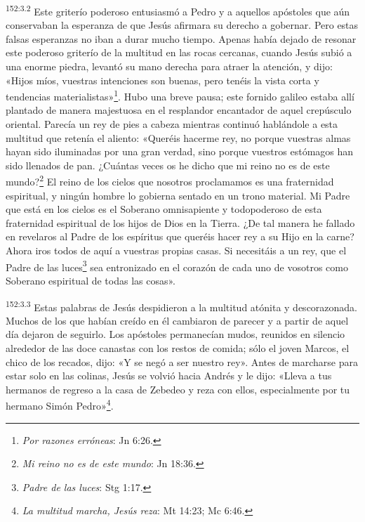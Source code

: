 \par
\textsuperscript{152:3.2} Este griterío poderoso entusiasmó a Pedro y a aquellos apóstoles que aún conservaban la esperanza de que Jesús afirmara su derecho a gobernar. Pero estas falsas esperanzas no iban a durar mucho tiempo. Apenas había dejado de resonar este poderoso griterío de la multitud en las rocas cercanas, cuando Jesús subió a una enorme piedra, levantó su mano derecha para atraer la atención, y dijo: «Hijos míos, vuestras intenciones son buenas, pero tenéis la vista corta y tendencias materialistas»\footnote{\textit{Por razones erróneas}: Jn 6:26.}. Hubo una breve pausa; este fornido galileo estaba allí plantado de manera majestuosa en el resplandor encantador de aquel crepúsculo oriental. Parecía un rey de pies a cabeza mientras continuó hablándole a esta multitud que retenía el aliento: «Queréis hacerme rey, no porque vuestras almas hayan sido iluminadas por una gran verdad, sino porque vuestros estómagos han sido llenados de pan. ¿Cuántas veces os he dicho que mi reino no es de este mundo?\footnote{\textit{Mi reino no es de este mundo}: Jn 18:36.} El reino de los cielos que nosotros proclamamos es una fraternidad espiritual, y ningún hombre lo gobierna sentado en un trono material. Mi Padre que está en los cielos es el Soberano omnisapiente y todopoderoso de esta fraternidad espiritual de los hijos de Dios en la Tierra. ¿De tal manera he fallado en revelaros al Padre de los espíritus que queréis hacer rey a su Hijo en la carne? Ahora iros todos de aquí a vuestras propias casas. Si necesitáis a un rey, que el Padre de las luces\footnote{\textit{Padre de las luces}: Stg 1:17.} sea entronizado en el corazón de cada uno de vosotros como Soberano espiritual de todas las cosas».

\par
\textsuperscript{152:3.3} Estas palabras de Jesús despidieron a la multitud atónita y descorazonada. Muchos de los que habían creído en él cambiaron de parecer y a partir de aquel día dejaron de seguirlo. Los apóstoles permanecían mudos, reunidos en silencio alrededor de las doce canastas con los restos de comida; sólo el joven Marcos, el chico de los recados, dijo: «Y se negó a ser nuestro rey». Antes de marcharse para estar solo en las colinas, Jesús se volvió hacia Andrés y le dijo: «Lleva a tus hermanos de regreso a la casa de Zebedeo y reza con ellos, especialmente por tu hermano Simón Pedro»\footnote{\textit{La multitud marcha, Jesús reza}: Mt 14:23; Mc 6:46.}.

